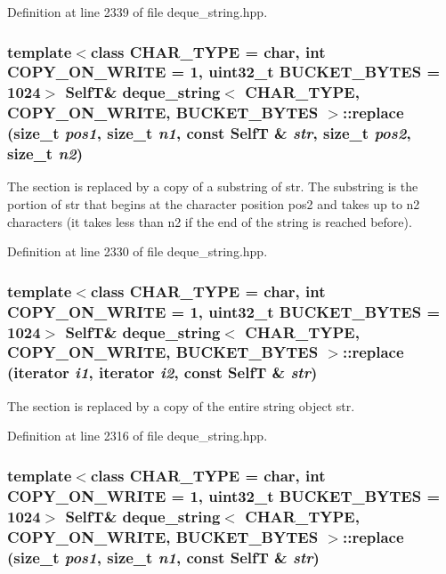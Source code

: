 Definition at line 2339 of file deque\_\-string.hpp.\hypertarget{classdeque__string_a80041a6c719e9ec64004af372ae17af}{
\subsubsection[{replace}]{\setlength{\rightskip}{0pt plus 5cm}template$<$class CHAR\_\-TYPE  = char, int COPY\_\-ON\_\-WRITE = 1, uint32\_\-t BUCKET\_\-BYTES = 1024$>$ {\bf SelfT}\& {\bf deque\_\-string}$<$ CHAR\_\-TYPE, COPY\_\-ON\_\-WRITE, BUCKET\_\-BYTES $>$::replace (size\_\-t {\em pos1}, \/  size\_\-t {\em n1}, \/  const {\bf SelfT} \& {\em str}, \/  size\_\-t {\em pos2}, \/  size\_\-t {\em n2})}}
\label{classdeque__string_a80041a6c719e9ec64004af372ae17af}


The section is replaced by a copy of a substring of str. The substring is the portion of str that begins at the character position pos2 and takes up to n2 characters (it takes less than n2 if the end of the string is reached before). 

Definition at line 2330 of file deque\_\-string.hpp.\hypertarget{classdeque__string_39ecf1ddad7e060513fdc9737ff3893a}{
\subsubsection[{replace}]{\setlength{\rightskip}{0pt plus 5cm}template$<$class CHAR\_\-TYPE  = char, int COPY\_\-ON\_\-WRITE = 1, uint32\_\-t BUCKET\_\-BYTES = 1024$>$ {\bf SelfT}\& {\bf deque\_\-string}$<$ CHAR\_\-TYPE, COPY\_\-ON\_\-WRITE, BUCKET\_\-BYTES $>$::replace (iterator {\em i1}, \/  iterator {\em i2}, \/  const {\bf SelfT} \& {\em str})}}
\label{classdeque__string_39ecf1ddad7e060513fdc9737ff3893a}


The section is replaced by a copy of the entire string object str. 

Definition at line 2316 of file deque\_\-string.hpp.\hypertarget{classdeque__string_d2e8ac524c0f6ad26297ef056f015688}{
\subsubsection[{replace}]{\setlength{\rightskip}{0pt plus 5cm}template$<$class CHAR\_\-TYPE  = char, int COPY\_\-ON\_\-WRITE = 1, uint32\_\-t BUCKET\_\-BYTES = 1024$>$ {\bf SelfT}\& {\bf deque\_\-string}$<$ CHAR\_\-TYPE, COPY\_\-ON\_\-WRITE, BUCKET\_\-BYTES $>$::replace (size\_\-t {\em pos1}, \/  size\_\-t {\em n1}, \/  const {\bf SelfT} \& {\em str})}}
\label{classdeque__string_d2e8ac524c0f6ad26297ef056f015688}


